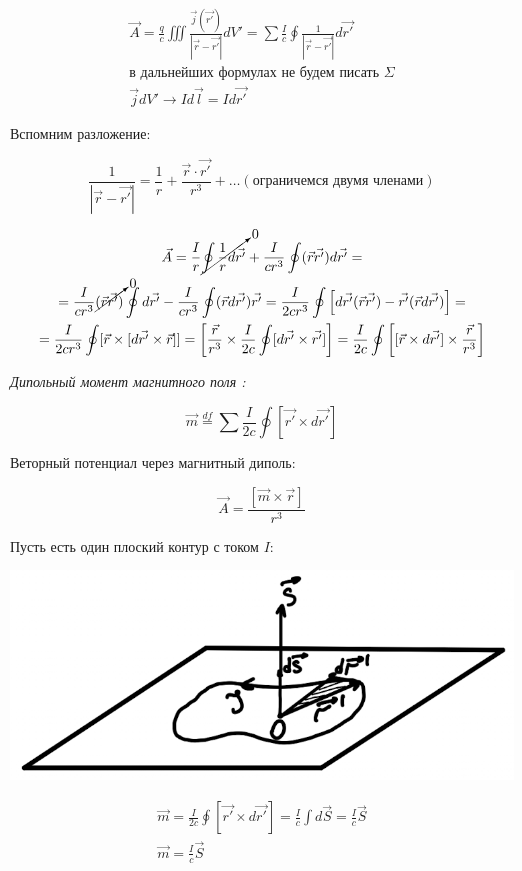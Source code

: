 \begin{gather*}
    \vec{A}=\frac{q}{c} \iiint \frac{\vec{j}(\vec{r'})}{|\vec{r}-\vec{r'}|}dV'=\sum \frac{I}{c}\oint \frac{1}{|\vec{r}-\vec{r'}|}d\vec{r'} \\
    \text{в дальнейших формулах не будем писать }\Sigma \\
    \vec{j}dV'\rightarrow Id\vec{l}=Id\vec{r'} 
\end{gather*}

Вспомним разложение:

\[
\frac{1}{|\vec{r}-\vec{r'}|} =\frac{1}{r}+\frac{\vec{r}\cdot\vec{r'}}{r^3}+\dots (\text{ограничемся двумя членами})
\]

\begin{gather*}
    \vec{A}= \frac{I}{r}  \cancelto{0}{\oint \frac{1}{r}  d\vec{r'}}+ \frac{I}{cr^3} \oint (\vec{r}\vec{r'})d\vec{r'}= \\ 
    =\frac{I}{cr^3} \cancelto{0}{(\vec{r}\vec{r'})}\oint d\vec{r'}-\frac{I}{cr^3}\oint (\vec{r}d\vec{r'})\vec{r'}= \frac{I}{2cr^3} \oint \left[d\vec{r'}(\vec{r}\vec{r'})-\vec{r'}(\vec{r}d\vec{r'})\right] = \\
    =\frac{I}{2cr^3} \oint [\vec{r}\times [d \vec{r'}\times \vec{r}]]=\left[ \frac{\vec{r}}{r^3}\times \frac{I}{2c} \oint [d\vec{r'}\times \vec{r'}]   \right]= \frac{I}{2c} \oint \left[ [\vec{r}\times d\vec{r'}]\times \frac{\vec{r}}{r^3}  \right]      
\end{gather*}

\textit{Дипольный момент магнитного поля : }

\[
\boxed{\vec{m}\overset{df}{=} \sum \frac{I}{2c} \oint [\vec{r'}\times d\vec{r'}] }
\]

Веторный потенциал через магнитный диполь:

\[
\vec{A}=\frac{[\vec{m}\times \vec{r}]}{r^3} 
\]

Пусть есть один  плоский контур с током $I$:

\begin{minipage}[c]{0.5\textwidth} %
    \includegraphics[width=\textwidth]{im/70.png} %
\end{minipage}%
\hfill
\begin{minipage}[c]{0.55\textwidth} %
    \begin{gather*}
        \vec{m}=\frac{I}{2c} \oint [\vec{r'}\times d \vec{r'}]=\frac{I}{c} \int d\vec{S}= \frac{I}{c} \vec{S} \\
        \vec{m}= \frac{I}{c} \vec{S}
    \end{gather*}
\end{minipage}

